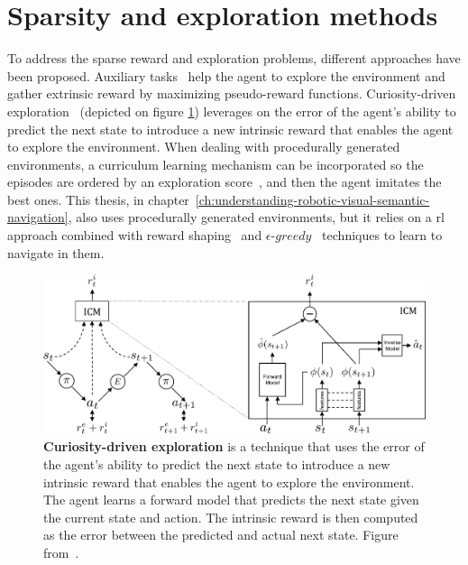 \section{Sparsity and exploration methods}\label{sec:sparsity-and-exploration-methods}
To address the sparse reward and exploration problems, different approaches have been proposed.
Auxiliary tasks~\cite{jaderberg2016, ye2021} help the agent to explore the environment and gather extrinsic reward by maximizing pseudo-reward functions.
Curiosity-driven exploration~\cite{pathak2017} (depicted on figure \ref{fig:curiosity}) leverages on the error of the agent's ability to predict the next state to introduce a new intrinsic reward that enables the agent to explore the environment.
When dealing with procedurally generated environments, a curriculum learning mechanism can be incorporated so the episodes are ordered by an exploration score~\cite{zha2020b}, and then the agent imitates the best ones.
This thesis, in chapter~\ref{ch:understanding-robotic-visual-semantic-navigation}, also uses procedurally generated environments, but it relies on a \acrshort{rl} approach combined with reward shaping~\cite{ng1999, jestel2021} and $\epsilon\text{-}greedy$~\cite{mnih2013} techniques to learn to navigate in them.

\begin{figure}
    \centering
    \includegraphics[width=\textwidth]{figures/related_work/curiosity}
    \caption[Curiosity-driven exploration]{\textbf{Curiosity-driven exploration} is a technique that uses the error of the agent's ability to predict the next state to introduce a new intrinsic reward that enables the agent to explore the environment.
    The agent learns a forward model that predicts the next state given the current state and action.
    The intrinsic reward is then computed as the error between the predicted and actual next state.
    Figure from~\cite{pathak2017}.}
    \label{fig:curiosity}
\end{figure}

